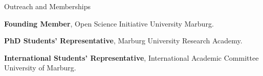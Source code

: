 \begin{rubric}{Outreach and Memberships}


\textbf{Founding Member}, Open Science Initiative University Marburg.

\textbf{PhD Students' Representative}, Marburg University Research Academy.

\entry*[2013:] 
\textbf{International Students' Representative}, International Academic Committee University of Marburg.

\end{rubric}
